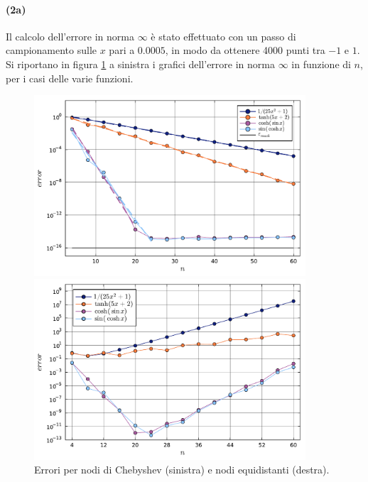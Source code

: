 \documentclass[letterpaper, 12pt]{article}
\numberwithin{equation}{section}    %
\begin{document}
\paragraph{(2a)}Il calcolo dell'errore in norma $\infty$ è stato effettuato con un passo di campionamento
sulle $x$ pari a $0.0005$, in modo da ottenere 4000 punti tra $-1$ e $1$. Si riportano in figura 
\ref{fig:es4_4_2_1} a sinistra i grafici dell'errore in norma $\infty$ in funzione di $n$, 
per i casi delle varie funzioni.
\begin{figure}[!ht]
    \begin{minipage}[b]{0.50\textwidth}
        \centering
        \includegraphics[width=0.9\textwidth]{4421.pdf}
        \caption*{}
    \end{minipage}
    \begin{minipage}[b]{0.50\textwidth}
        \centering
        \includegraphics[width=0.9\textwidth]{4422.pdf}
        \caption*{}
    \end{minipage}
    \caption{Errori per nodi di Chebyshev (sinistra) e nodi equidistanti (destra).}
    \label{fig:es4_4_2_1}
\end{figure}
\end{document}
